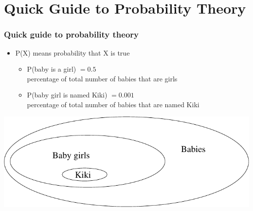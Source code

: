 \documentclass[handout]{beamer}
\begin{document}



\section{Quick Guide to Probability Theory}
\frame{\tableofcontents[currentsection]}

\begin{frame}
\frametitle{Quick guide to probability theory}
\begin{itemize}[<+->]
\item P(X) means probability that X is true
\begin{itemize}[<+->]
\item P(baby is a girl) $= 0.5$ \\
percentage of total number of babies that are girls
\item P(baby girl is named Kiki) $= 0.001$ \\
percentage of total number of babies that are named Kiki
\end{itemize}
\end{itemize}
\includegraphics[scale=.8]{figures/prob-fig1}
\end{frame}


\end{document}
